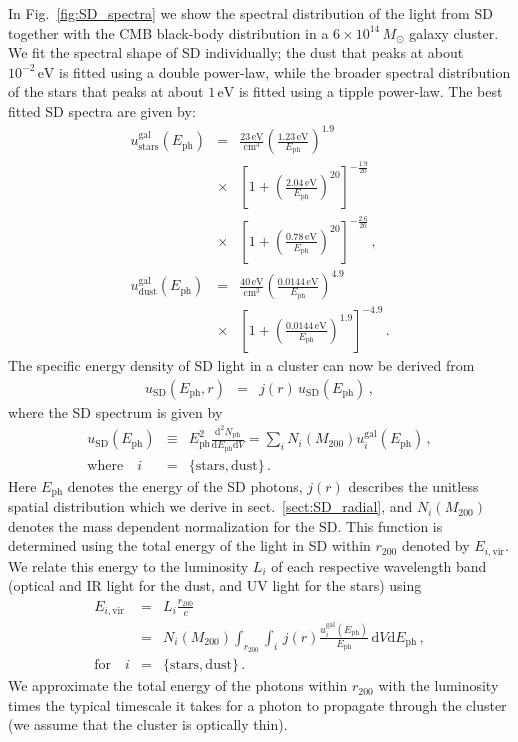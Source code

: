 \documentclass[10pt,aps,pra,reprint,amsmath,amsfonts,amssymb,showpacs,nofootinbib,floatfix]{revtex4-1}
\def\del#1{{}}
\newcommand{\rmn}{\mathrm}
\newcommand{\ph}{\rmn{ph}}
\newcommand{\eph}{E_\ph}
\newcommand{\vir}{\rmn{vir}}
\newcommand{\gal}{\rmn{gal}}
\newcommand{\sd}{\rmn{SD}}
\newcommand{\msun}{M_\odot}
\newcommand{\stars}{\rmn{stars}}
\newcommand{\dust}{\rmn{dust}}
\newcommand{\ev}{\rmn{eV}}
\newcommand{\dd}{\rmn{d}}
\newcommand{\rvir}{r_{200}}
\newcommand{\mvir}{M_{200}}
\begin{document}
In Fig.~\ref{fig:SD_spectra} we show the spectral distribution of the
light from SD together with the CMB black-body distribution in a
$6\times10^{14}\,\msun$ galaxy cluster. We fit the spectral shape of
SD individually; the dust that peaks at about $10^{-2}\,\ev$ is fitted
using a double power-law, while the broader spectral distribution of
the stars that peaks at about $1\,\ev$ is fitted using a tipple
power-law. The best fitted SD spectra are given by: \del{both at the
  radius $r=0.03\rvir$ where the energy density of the smooth light
  from SD (see Fig.~\ref{fig:SD_Edens}) equals the energy density of
  the CMB. We have renormalized both the spectral data and the fitted
  spectra using the luminosity from stars and dust individually.}
\begin{eqnarray}
  u_\stars^\gal(\eph) &=& \frac{23\,\rmn{eV}}{\rmn{cm}^3} 
  \left(\frac{1.23\,\rmn{eV}}{\eph}\right)^{1.9} \nonumber \\
  &\times&\left[1+\left(\frac{2.04\,\rmn{eV}}{\eph}\right)^{20}\right]
  ^{-\frac{1.9}{20}}\nonumber \\
  &\times& \left[1+\left(\frac{0.78\,\rmn{eV}}{\eph}\right)^{20}\right]^{-\frac{2.6}{20}}\,, \\
  u_\dust^\gal(\eph) &=& 
  \frac{40\,\rmn{eV}}{\rmn{cm}^3} 
  \left(\frac{0.0144\,\rmn{eV}}{\eph}\right)^{4.9}\nonumber \\
  &\times& \left[1+\left(\frac{0.0144\,\rmn{eV}}{\eph}\right)^{1.9}\right]^{-4.9}\,.
\end{eqnarray}
The specific energy density of SD light in a cluster can now be
derived from 
\begin{eqnarray} 
u_\sd(\eph, r) &=& j(r)\,u_\sd(\eph)\,,
\label{eq:u_SD_re}
\end{eqnarray}
where the SD spectrum is given by 
\begin{eqnarray}
  u_\sd(\eph) &\equiv& \eph^2\frac{\dd^2 N_\ph}{\dd \eph \dd V}
  =  \sum_i N_i(\mvir) u_i^\gal(\eph)\,,\nonumber \\ 
\rmn{where}\quad i&=&\{\rmn{stars,dust}\}\,.
\end{eqnarray}
Here $\eph$ denotes the energy of the SD photons, $j(r)$ describes the
unitless spatial distribution which we derive in
sect.~\ref{sect:SD_radial}, and $N_i(\mvir)$ denotes the mass
dependent normalization for the SD. This function is determined using
the total energy of the light in SD within $\rvir$ denoted by
$E_{i,\vir}$. We relate this energy to the luminosity $L_i$ of each
respective wavelength band (optical and IR light for the dust, and UV
light for the stars) using
\begin{eqnarray} 
  E_{i,\vir} &=& L_i \frac{\rvir}{c} \nonumber \\
  &=&N_i(\mvir)\int_{\rvir} \int_i \,j(r) 
  \frac{u_i^\gal(\eph)}{\eph}\,\dd V\dd \eph\,,\nonumber \\
 \rmn{for}\quad i&=&\{\rmn{stars,dust}\}\,.
\label{eq:E_SD}
\end{eqnarray}
We approximate the total energy of the photons within $\rvir$ with the
luminosity \cite{2008A&A...490..547G} times the typical timescale it
takes for a photon to propagate through the cluster (we assume that
the cluster is optically thin).
\end{document}

